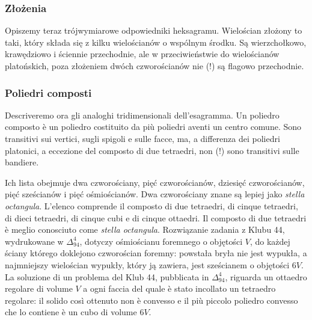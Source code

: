 
\subsubsection{Złożenia} %
Opiszemy teraz trójwymiarowe odpowiedniki heksagramu. %
Wielościan złożony to taki, który składa się z kilku wielościanów o wspólnym środku. %
Są wierzchołkowo, krawędziowo i ściennie przechodnie, ale w przeciwieństwie do wielościanów platońskich, poza złożeniem dwóch czworościanów nie (!) są flagowo przechodnie. %
\subsubsection{Poliedri composti} %
Descriveremo ora gli analoghi tridimensionali dell'esagramma. %
Un poliedro composto è un poliedro costituito da più poliedri aventi un centro comune. %
Sono transitivi sui vertici, sugli spigoli e sulle facce, ma, a differenza dei poliedri platonici, a eccezione del composto di due tetraedri, non (!) sono transitivi sulle bandiere. %

Ich lista obejmuje dwa czworościany, pięć czworościanów, dziesięć czworościanów, pięć sześcianów i pięć ośmiościanów. %
Dwa czworościany znane są lepiej jako \emph{stella octangula}. %
L'elenco comprende il composto di due tetraedri, di cinque tetraedri, di dieci tetraedri, di cinque cubi e di cinque ottaedri. %
Il composto di due tetraedri è meglio conosciuto come \emph{stella octangula}. %
Rozwiązanie zadania z Klubu 44, wydrukowane w $\Delta_{94}^{4}$, dotyczy ośmiościanu foremnego o objętości $V$, do każdej ściany którego doklejono czworościan foremny: powstała bryła nie jest wypukła, a najmniejszy wielościan wypukły, który ją zawiera, jest sześcianem o objętości $6V$. %
La soluzione di un problema del Klub 44, pubblicata in $\Delta_{94}^{4}$, riguarda un ottaedro regolare di volume $V$ a ogni faccia del quale è stato incollato un tetraedro regolare: il solido così ottenuto non è convesso e il più piccolo poliedro convesso che lo contiene è un cubo di volume $6V$. %

